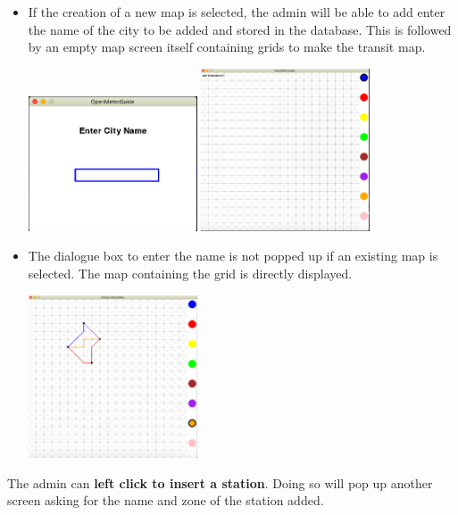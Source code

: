 \documentclass[fontsize=11pt]{article}
\begin{document}
    \begin{itemize}
        \item If the creation of a new map is selected, the admin will be able to add enter the name of the city to be added and stored in the database. This is followed by an empty map screen itself containing grids to make the transit map.
        \begin{center}
            \includegraphics[width = 5cm]{enter city name.png} \quad
            \includegraphics[width = 5cm]{blank map screen.png}
        \end{center}

        \item The dialogue box to enter the name is not popped up if an existing map is selected. The map containing the grid is directly displayed.
        \\
        \begin{center}
            \includegraphics[width = 5cm]{Sample Map.png}
        \end{center}
    \end{itemize}
    The admin can \textbf{left click to insert a station}. Doing so will pop up another screen asking for the name and zone of the station added. \\
\end{document}
